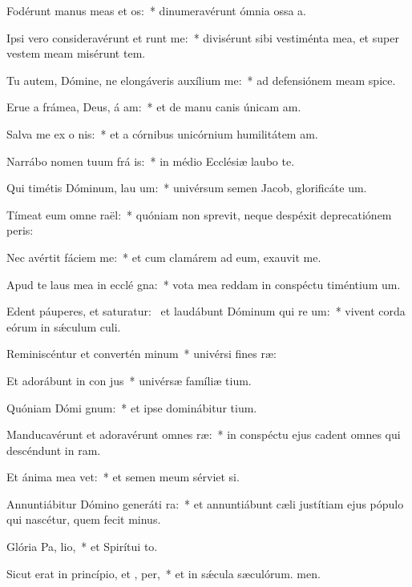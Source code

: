 \item Fodérunt manus meas et  os:~* dinumeravérunt ómnia ossa a.
\item Ipsi vero consideravérunt et runt me:~* divisérunt sibi vestiménta mea, et super vestem meam misérunt tem.
\item Tu autem, Dómine, ne elongáveris auxílium   me:~* ad defensiónem meam spice.
\item Erue a frámea, Deus, á am:~* et de manu canis únicam am.
\item Salva me ex o nis:~* et a córnibus unicórnium humilitátem am.
\item Narrábo nomen tuum frá is:~* in médio Ecclésiæ laubo te.
\item Qui timétis Dóminum, lau um:~* univérsum semen Jacob, glorificáte um.
\item Tímeat eum omne  raël:~* quóniam non sprevit, neque despéxit deprecatiónem peris:
\item Nec avértit fáciem   me:~* et cum clamárem ad eum, exauvit me.
\item Apud te laus mea in ecclé gna:~* vota mea reddam in conspéctu timéntium um.
\item Edent páuperes, et saturatur:~\pscross{} et laudábunt Dóminum qui re um:~* vivent corda eórum in sǽculum culi.
\item Reminiscéntur et convertén  minum~* univérsi fines ræ:
\item Et adorábunt in con jus~* univérsæ famíliæ tium.
\item Quóniam Dómi  gnum:~* et ipse dominábitur tium.
\item Manducavérunt et adoravérunt omnes  ræ:~* in conspéctu ejus cadent omnes qui descéndunt in ram.
\item Et ánima mea  vet:~* et semen meum sérviet si.
\item Annuntiábitur Dómino generáti ra:~* et annuntiábunt cæli justítiam ejus pópulo qui nascétur, quem fecit minus.
\item Glória Pa,  lio,~* et Spirítui to.
\item Sicut erat in princípio, et ,  per,~* et in sǽcula sæculórum. men.
